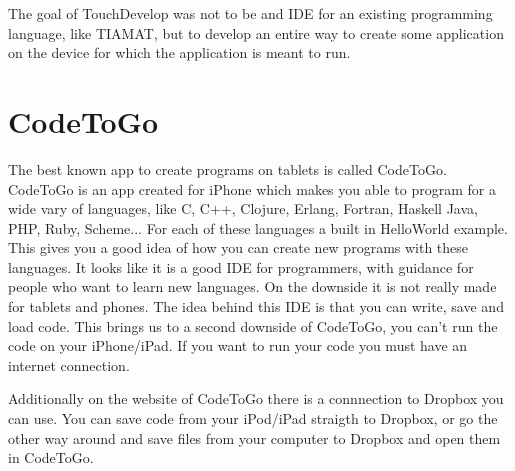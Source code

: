 \documentclass[a4paper,12pt]{report}
\begin{document}
The goal of TouchDevelop was not to be and IDE for an existing programming language, like TIAMAT, but to develop an entire way to create some application on the device for which the application
is meant to run.  

\section{CodeToGo}
The best known app to create programs on tablets is called CodeToGo. CodeToGo is an app created for iPhone which makes you able to program
for a wide vary of languages, like C, C++, Clojure, Erlang, Fortran, Haskell Java, PHP, Ruby, Scheme... For each of these languages a built in HelloWorld example. This gives you a good idea of how
you can create new programs with these languages. It looks like it is a good IDE for programmers, with guidance for people who want to learn new languages. On the downside it is not really
made for tablets and phones. The idea behind this IDE is that you can write, save and load code. This brings us to a second downside of CodeToGo, you can't run the code on your iPhone/iPad. If you
want to run your code you must have an internet connection.

Additionally on the website of CodeToGo there is a connnection to Dropbox you can use. You can save code from your iPod/iPad straigth to Dropbox, or go the other way around and save files
from your computer to Dropbox and open them in CodeToGo.
\end{document}
